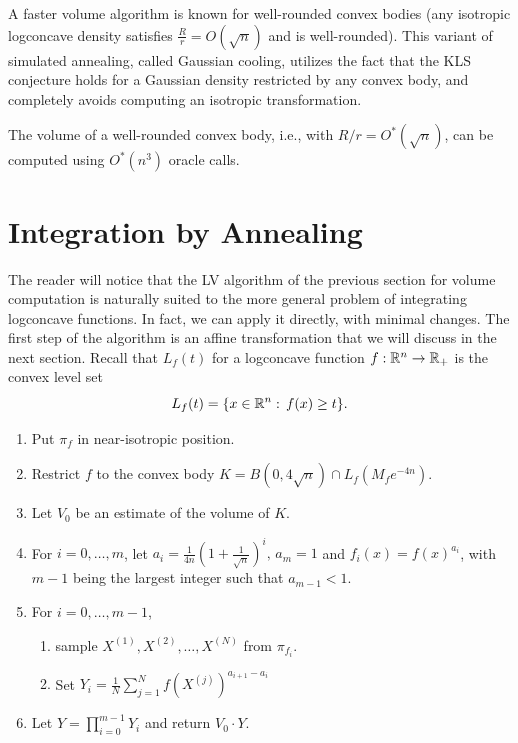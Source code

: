 A faster volume algorithm is known for well-rounded convex bodies
(any isotropic logconcave density satisfies $\frac{R}{r}=O(\sqrt{n})$
and is well-rounded). This variant of simulated annealing, called
Gaussian cooling, utilizes the fact that the KLS conjecture holds
for a Gaussian density restricted by any convex body, and completely
avoids computing an isotropic transformation.
\begin{thm}[\cite{CV2015}]
The volume of a well-rounded convex body, i.e., with $R/r=O^{*}(\sqrt{n})$,
can be computed using $O^{*}(n^{3})$ oracle calls.
\end{thm}


\section{Integration by Annealing}

The reader will notice that the LV algorithm of the previous section
for volume computation is naturally suited to the more general problem
of integrating logconcave functions. In fact, we can apply it directly,
with minimal changes. The first step of the algorithm is an affine
transformation that we will discuss in the next section. Recall that
$L_{f}(t)$ for a logconcave function $f:\mathbb{R}^{n}\rightarrow\mathbb{R}_{+}$
is the convex level set 
\[
L_{f}(t)=\{x\in\mathbb{R}^{n}:\,f(x)\ge t\}.
\]

\begin{algorithm2e}[H]

\caption{$\mathtt{LV\ Integration}$}

\SetAlgoLined
\begin{enumerate}
\item Put $\pi_{f}$ in near-isotropic position. 
\item Restrict $f$ to the convex body $K=B(0,4\sqrt{n})\cap L_{f}(M_{f}e^{-4n})$.
\item Let $V_{0}$ be an estimate of the volume of $K.$ 
\item For $i=0,\ldots,m$, let $a_{i}=\frac{1}{4n}(1+\frac{1}{\sqrt{n}})^{i},\,a_{m}=1$
and $f_{i}(x)=f(x)^{a_{i}}$, with $m-1$ being the largest integer
such that $a_{m-1}<1$. 
\item For $i=0,\ldots,m-1$, 
\begin{enumerate}
\item sample $X^{(1)},X^{(2)},\ldots,X^{(N)}$ from $\pi_{f_{i}}$.
\item Set $Y_{i}=\frac{1}{N}\sum^{N}_{j=1}f(X^{(j)})^{a_{i+1}-a_{i}}$
\end{enumerate}
\item Let $Y=\prod^{m-1}_{i=0}Y_{i}$ and return $V_{0}\cdot Y$.
\end{enumerate}
\end{algorithm2e}

